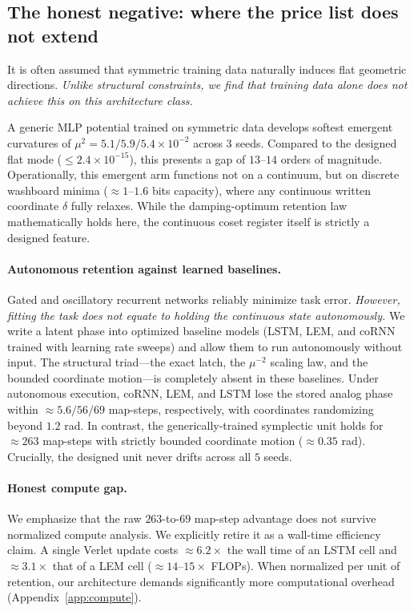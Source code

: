 \documentclass{article}
\begin{document}
\subsection{The honest negative: where the price list does not extend}\label{sec:boundary}

It is often assumed that symmetric training data naturally induces flat geometric directions. \emph{Unlike structural constraints, we find that training data alone does not achieve this on this architecture class.}

A generic MLP potential trained on symmetric data develops softest emergent curvatures of $\mu^2=5.1/5.9/5.4\!\times\!10^{-2}$ across $3$ seeds. Compared to the designed flat mode ($\le2.4\!\times\!10^{-15}$), this presents a gap of $13$--$14$ orders of magnitude. Operationally, this emergent arm functions not on a continuum, but on discrete washboard minima ($\approx1$--$1.6$ bits capacity), where any continuous written coordinate $\delta$ fully relaxes. While the damping-optimum retention law mathematically holds here, the continuous coset register itself is strictly a designed feature.

\paragraph{Autonomous retention against learned baselines.} Gated and oscillatory recurrent networks reliably minimize task error. \emph{However, fitting the task does not equate to holding the continuous state autonomously.} We write a latent phase into optimized baseline models (LSTM, LEM, and coRNN trained with learning rate sweeps) and allow them to run autonomously without input. The structural triad---the exact latch, the $\mu^{-2}$ scaling law, and the bounded coordinate motion---is completely absent in these baselines. Under autonomous execution, coRNN, LEM, and LSTM lose the stored analog phase within $\approx5.6/56/69$ map-steps, respectively, with coordinates randomizing beyond $1.2$ rad. In contrast, the generically-trained symplectic unit holds for $\approx263$ map-steps with strictly bounded coordinate motion ($\approx0.35$ rad). Crucially, the designed unit never drifts across all $5$ seeds.

\paragraph{Honest compute gap.} We emphasize that the raw $263$-to-$69$ map-step advantage does not survive normalized compute analysis. We explicitly retire it as a wall-time efficiency claim. A single Verlet update costs $\approx6.2\times$ the wall time of an LSTM cell and $\approx3.1\times$ that of a LEM cell ($\approx14$--$15\times$ FLOPs). When normalized per unit of retention, our architecture demands significantly more computational overhead (Appendix~\ref{app:compute}).
\end{document}
